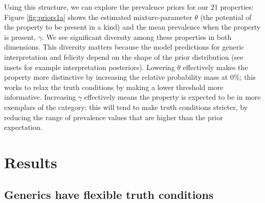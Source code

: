 \documentclass{pnastwo}
\begin{document}
\begin{article}
Using this structure, we can explore the prevalence priors for our 21 properties:
Figure \ref{fig:priors1a} shows the estimated mixture-parameter $\theta$ (the potential of the property to be present in a kind) and the mean prevalence when the property is present, $\gamma$. 
We see significant diversity among these properties in both dimensions. 
This diversity matters because the model predictions for generic interpretation and felicity depend on the shape of the prior distribution (see insets for example interpretation posteriors).
Lowering $\theta$ effectively makes the property more distinctive by increasing the relative probability mass at 0\%; this works to relax the truth conditions by making a lower threshold more informative.
Increasing $\gamma$ effectively means the property is expected to be in more exemplars of the category; this will tend to make truth conditions stricter, by reducing the range of prevalence values that are higher than the prior expectation. 


\section{Results}

\subsection{Generics have flexible truth conditions}




\end{article}
\end{document}
